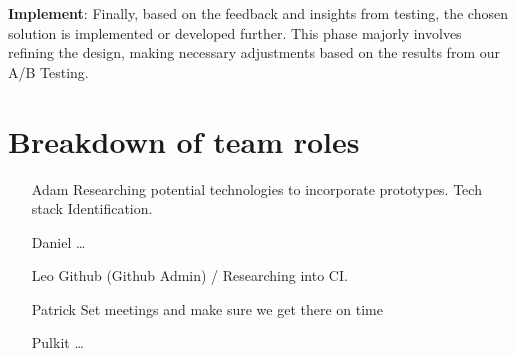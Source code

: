\documentclass[ansiapaper,12pt]{article}
\begin{document}
\textbf{Implement}: Finally, based on the feedback and insights from testing, the chosen solution is implemented or developed further. This phase majorly involves refining the design, making necessary adjustments based on the results from our A/B Testing.

\section{Breakdown of team roles}

\begin{itemize}
    \item[Adam] Researching potential technologies to incorporate prototypes. Tech stack Identification.
    \item[Daniel] \dots
    \item[Leo] Github (Github Admin) / Researching into CI.
    \item[Patrick] Set meetings and make sure we get there on time
    \item[Pulkit] \dots
\end{itemize}
\end{document}
